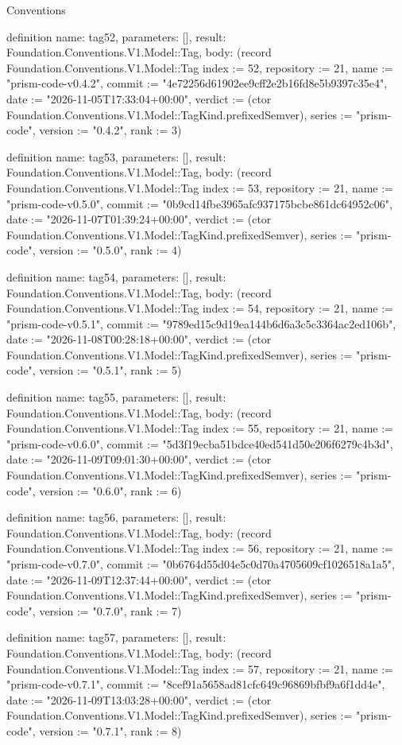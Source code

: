 \begin{lexlean}{Conventions}
\begin{semanticmodule}
definition{
  name: tag52,
  parameters: [],
  result: Foundation.Conventions.V1.Model::Tag,
  body: (record Foundation.Conventions.V1.Model::Tag {index := 52, repository := 21, name := "prism-code-v0.4.2", commit := "4e72256d61902ee9cff2e2b16fd8e5b9397c35e4", date := "2026-11-05T17:33:04+00:00", verdict := (ctor Foundation.Conventions.V1.Model::TagKind.prefixedSemver), series := "prism-code", version := "0.4.2", rank := 3})
}

definition{
  name: tag53,
  parameters: [],
  result: Foundation.Conventions.V1.Model::Tag,
  body: (record Foundation.Conventions.V1.Model::Tag {index := 53, repository := 21, name := "prism-code-v0.5.0", commit := "0b9cd14fbe3965afc937175bcbe861dc64952c06", date := "2026-11-07T01:39:24+00:00", verdict := (ctor Foundation.Conventions.V1.Model::TagKind.prefixedSemver), series := "prism-code", version := "0.5.0", rank := 4})
}

definition{
  name: tag54,
  parameters: [],
  result: Foundation.Conventions.V1.Model::Tag,
  body: (record Foundation.Conventions.V1.Model::Tag {index := 54, repository := 21, name := "prism-code-v0.5.1", commit := "9789ed15c9d19ea144b6d6a3c5c3364ac2ed106b", date := "2026-11-08T00:28:18+00:00", verdict := (ctor Foundation.Conventions.V1.Model::TagKind.prefixedSemver), series := "prism-code", version := "0.5.1", rank := 5})
}

definition{
  name: tag55,
  parameters: [],
  result: Foundation.Conventions.V1.Model::Tag,
  body: (record Foundation.Conventions.V1.Model::Tag {index := 55, repository := 21, name := "prism-code-v0.6.0", commit := "5d3f19ecba51bdce40ed541d50e206f6279c4b3d", date := "2026-11-09T09:01:30+00:00", verdict := (ctor Foundation.Conventions.V1.Model::TagKind.prefixedSemver), series := "prism-code", version := "0.6.0", rank := 6})
}

definition{
  name: tag56,
  parameters: [],
  result: Foundation.Conventions.V1.Model::Tag,
  body: (record Foundation.Conventions.V1.Model::Tag {index := 56, repository := 21, name := "prism-code-v0.7.0", commit := "0b6764d55d04e5c0d70a4705609cf1026518a1a5", date := "2026-11-09T12:37:44+00:00", verdict := (ctor Foundation.Conventions.V1.Model::TagKind.prefixedSemver), series := "prism-code", version := "0.7.0", rank := 7})
}

definition{
  name: tag57,
  parameters: [],
  result: Foundation.Conventions.V1.Model::Tag,
  body: (record Foundation.Conventions.V1.Model::Tag {index := 57, repository := 21, name := "prism-code-v0.7.1", commit := "8cef91a5658ad81cfc649c96869bfbf9a6f1dd4e", date := "2026-11-09T13:03:28+00:00", verdict := (ctor Foundation.Conventions.V1.Model::TagKind.prefixedSemver), series := "prism-code", version := "0.7.1", rank := 8})
}


\end{semanticmodule}
\end{lexlean}

